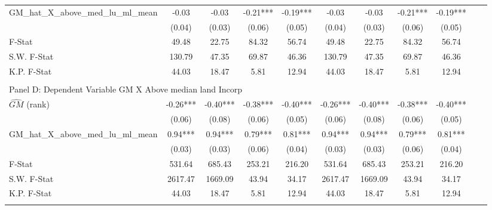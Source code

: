 \begin{table}[htbp]
\begin{threeparttable}
\begin{tabular}{l*{10}{c}}
\addlinespace
GM\_hat\_X\_above\_med\_lu\_ml\_mean&      -0.03   &      -0.03   &      -0.21***&      -0.19***&      -0.03   &      -0.03   &      -0.21***&      -0.19***\\
                &     (0.04)   &     (0.03)   &     (0.06)   &     (0.05)   &     (0.04)   &     (0.03)   &     (0.06)   &     (0.05)   \\
\midrule
F-Stat          &      49.48   &      22.75   &      84.32   &      56.74   &      49.48   &      22.75   &      84.32   &      56.74   \\
S.W. F-Stat     &     130.79   &      47.35   &      69.87   &      46.36   &     130.79   &      47.35   &      69.87   &      46.36   \\
K.P. F-Stat     &      44.03   &      18.47   &       5.81   &      12.94   &      44.03   &      18.47   &       5.81   &      12.94   \\
\cmidrule[\heavyrulewidth](lr){1-9} \\ \cmidrule[\heavyrulewidth](lr){1-9}
\multicolumn{8}{l}{Panel D: Dependent Variable GM X Above median land Incorp}\\
\cmidrule(lr){1-9}
$\hat{GM}$ (rank)&      -0.26***&      -0.40***&      -0.38***&      -0.40***&      -0.26***&      -0.40***&      -0.38***&      -0.40***\\
                &     (0.06)   &     (0.08)   &     (0.06)   &     (0.05)   &     (0.06)   &     (0.08)   &     (0.06)   &     (0.05)   \\
\addlinespace
GM\_hat\_X\_above\_med\_lu\_ml\_mean&       0.94***&       0.94***&       0.79***&       0.81***&       0.94***&       0.94***&       0.79***&       0.81***\\
                &     (0.03)   &     (0.03)   &     (0.06)   &     (0.04)   &     (0.03)   &     (0.03)   &     (0.06)   &     (0.04)   \\
\midrule
F-Stat          &     531.64   &     685.43   &     253.21   &     216.20   &     531.64   &     685.43   &     253.21   &     216.20   \\
S.W. F-Stat     &    2617.47   &    1669.09   &      43.94   &      34.17   &    2617.47   &    1669.09   &      43.94   &      34.17   \\
K.P. F-Stat     &      44.03   &      18.47   &       5.81   &      12.94   &      44.03   &      18.47   &       5.81   &      12.94   \\
\cmidrule[\heavyrulewidth](lr){1-9} \\ \cmidrule[\heavyrulewidth](lr){1-9}

\end{tabular}
\end{threeparttable}
\end{table}

